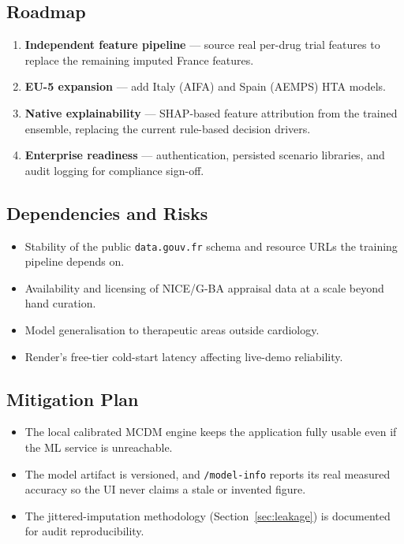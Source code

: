 \documentclass[11pt,a4paper]{article}
\begin{document}
\subsection{Roadmap}
\begin{enumerate}[leftmargin=1.5em]
  \item[\textbf{M1}] \textbf{Independent feature pipeline} --- source real per-drug trial
  features to replace the remaining imputed France features.
  \item[\textbf{M2}] \textbf{EU-5 expansion} --- add Italy (AIFA) and Spain (AEMPS) HTA models.
  \item[\textbf{M3}] \textbf{Native explainability} --- SHAP-based feature attribution from the
  trained ensemble, replacing the current rule-based decision drivers.
  \item[\textbf{M4}] \textbf{Enterprise readiness} --- authentication, persisted scenario
  libraries, and audit logging for compliance sign-off.
\end{enumerate}

\subsection{Dependencies and Risks}
\begin{itemize}[leftmargin=1.3em]
  \item Stability of the public \texttt{data.gouv.fr} schema and resource URLs the training
  pipeline depends on.
  \item Availability and licensing of NICE/G-BA appraisal data at a scale beyond hand curation.
  \item Model generalisation to therapeutic areas outside cardiology.
  \item Render's free-tier cold-start latency affecting live-demo reliability.
\end{itemize}

\subsection{Mitigation Plan}
\begin{itemize}[leftmargin=1.3em]
  \item The local calibrated MCDM engine keeps the application fully usable even if the ML
  service is unreachable.
  \item The model artifact is versioned, and \texttt{/model-info} reports its real measured
  accuracy so the UI never claims a stale or invented figure.
  \item The jittered-imputation methodology (Section~\ref{sec:leakage}) is documented for audit
  reproducibility.
\end{itemize}
\end{document}
